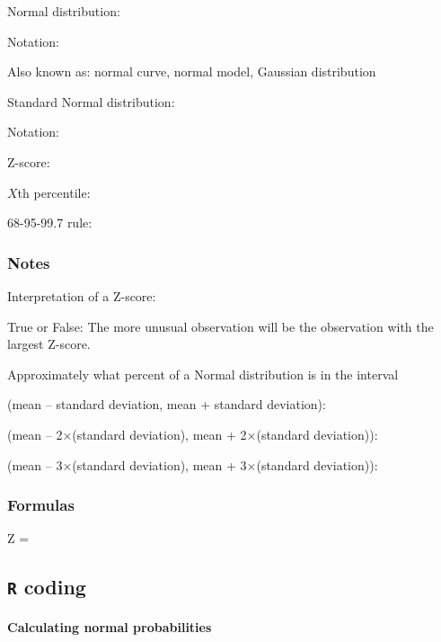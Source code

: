 \documentclass[
]{report}
\newcommand{\rgs}{\vspace{12pt}} %
\newcommand{\rgi}{\hspace{24pt}}  %
\begin{document}
Normal distribution:
\rgs

\rgi Notation:
\rgs

\rgi \rgi Also known as: normal curve, normal model, Gaussian distribution

\newpage

Standard Normal distribution:
\rgs

\rgi Notation:
\rgs

Z-score:
\rgs

\(X\)th percentile:
\rgs

68-95-99.7 rule:
\rgs

\hypertarget{notes-16}{%
\subsubsection*{Notes}\label{notes-16}}

Interpretation of a Z-score:
\rgs

True or False: The more unusual observation will be the observation with the largest Z-score.

Approximately what percent of a Normal distribution is in the interval

\rgi (mean -- standard deviation, mean + standard deviation):
\rgs

\rgi (mean -- 2\(\times\)(standard deviation), mean + 2\(\times\)(standard deviation)):
\rgs

\rgi (mean -- 3\(\times\)(standard deviation), mean + 3\(\times\)(standard deviation)):
\rgs

\hypertarget{formulas-1}{%
\subsubsection*{Formulas}\label{formulas-1}}

Z =
\rgs

\hypertarget{r-coding}{%
\subsection*{\texorpdfstring{\texttt{R} coding}{R coding}}\label{r-coding}}

\hypertarget{calculating-normal-probabilities}{%
\paragraph*{Calculating normal probabilities}\label{calculating-normal-probabilities}}
\end{document}
